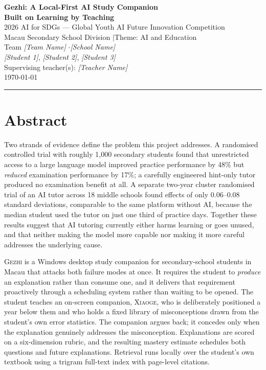 \documentclass[11pt,a4paper]{article}
\newcommand{\gezhi}{\textsc{Gezhi}}
\newcommand{\xiaoge}{\textsc{Xiaoge}}
\begin{document}
\begin{center}
{\LARGE\bfseries Gezhi: A Local-First AI Study Companion\\[3pt]
Built on Learning by Teaching}\\[7pt]
{\small 2026 AI for SDGs --- Global Youth AI Future Innovation Competition\\
Macau Secondary School Division \quad$\vert$\quad Theme: AI and Education}\\[4pt]
{\footnotesize
Team \textit{[Team Name]} \quad$\cdot$\quad \textit{[School Name]}\\[2pt]
\textit{[Student 1]}, \textit{[Student 2]}, \textit{[Student 3]}\\
Supervising teacher(s): \textit{[Teacher Name]}\\[2pt]
\today}
\end{center}
\vspace{-4pt}
\hrule
\vspace{6pt}

\section*{Abstract}

Two strands of evidence define the problem this project addresses. A randomised controlled
trial with roughly 1{,}000 secondary students found that unrestricted access to a large
language model improved practice performance by 48\% but \emph{reduced} examination
performance by 17\%; a carefully engineered hint-only tutor produced no examination benefit
at all. A separate two-year cluster randomised trial of an AI tutor across 18 middle schools
found effects of only 0.06--0.08 standard deviations, comparable to the same platform
without AI, because the median student used the tutor on just one third of practice days.
Together these results suggest that AI tutoring currently either harms learning or goes
unused, and that neither making the model more capable nor making it more careful addresses
the underlying cause.

\gezhi{} is a Windows desktop study companion for secondary-school students in Macau that
attacks both failure modes at once. It requires the student to \emph{produce} an explanation
rather than consume one, and it delivers that requirement proactively through a scheduling
system rather than waiting to be opened. The student teaches an on-screen companion,
\xiaoge{}, who is deliberately positioned a year below them and who holds a fixed library of
misconceptions drawn from the student's own error statistics. The companion argues back; it
concedes only when the explanation genuinely addresses the misconception. Explanations are
scored on a six-dimension rubric, and the resulting mastery estimate schedules both
questions and future explanations. Retrieval runs locally over the student's own textbook
using a trigram full-text index with page-level citations.
\end{document}
